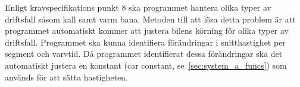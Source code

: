 Enligt kravspecifikations punkt 8 ska programmet hantera olika typer av
driftsfall såsom kall samt varm bana.  Metoden till att lösa detta problem är
att programmet automatiskt kommer att justera bilens körning för olika typer av
driftsfall. Programmet ska kunna identifiera förändringar i snitthastighet per
segment och varvtid. Då programmet identifierat dessa förändringar ska det
automatiskt justera en konstant (car constant, se~\ref{sec:system_a_funcs}) som
används för att sätta hastigheten.
